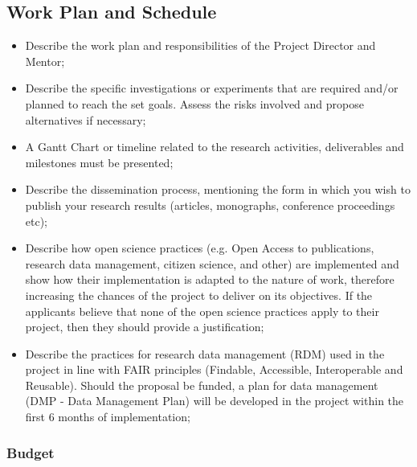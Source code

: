 \documentclass[draftproposal,pncdib]{pncdi-pd}
\begin{document}
\subsection{Work Plan and Schedule}
\label{sc:project:workplan}

\begin{pncdiexplanation}
\begin{itemize}
\item
Describe the work plan and responsibilities of the Project Director and Mentor;

\item
Describe the specific investigations or experiments that are required and/or planned
to reach the set goals. Assess the risks involved and propose alternatives if necessary;

\item
A Gantt Chart or timeline related to the research activities, deliverables and milestones
must be presented;

\item
Describe the dissemination process, mentioning the form in which you wish to publish your
research results (articles, monographs, conference proceedings etc);

\item
Describe how open science practices (e.g. Open Access to publications, research data
management, citizen science, and other) are implemented and show how their implementation
is adapted to the nature of work, therefore increasing the chances of the project to
deliver on its objectives. If the applicants believe that none of the open science practices
apply to their project, then they should provide a justification;

\item
Describe the practices for research data management (RDM) used in the project in line
with FAIR principles (Findable, Accessible, Interoperable and Reusable). Should the
proposal be funded, a plan for data management (DMP - Data Management Plan) will be
developed in the project within the first 6 months of implementation;
\end{itemize}
\end{pncdiexplanation}

\subsubsection{Budget}
\label{sc:project:workplan:budget}
\end{document}
